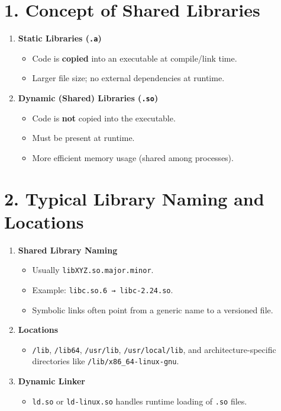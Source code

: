 \documentclass[a4paper]{report}
\begin{document}
\section*{1. Concept of Shared Libraries}

\begin{enumerate}
    \item \textbf{Static Libraries (\texttt{.a})}
    \begin{itemize}
        \item Code is \textbf{copied} into an executable at compile/link time.
        \item Larger file size; no external dependencies at runtime.
    \end{itemize}

    \item \textbf{Dynamic (Shared) Libraries (\texttt{.so})}
    \begin{itemize}
        \item Code is \textbf{not} copied into the executable.
        \item Must be present at runtime.
        \item More efficient memory usage (shared among processes).
    \end{itemize}
\end{enumerate}

\section*{2. Typical Library Naming and Locations}

\begin{enumerate}
    \item \textbf{Shared Library Naming}
    \begin{itemize}
        \item Usually \texttt{libXYZ.so.major.minor}.
        \item Example: \texttt{libc.so.6 → libc-2.24.so}.
        \item Symbolic links often point from a generic name to a versioned file.
    \end{itemize}

    \item \textbf{Locations}
    \begin{itemize}
        \item \texttt{/lib}, \texttt{/lib64}, \texttt{/usr/lib}, \texttt{/usr/local/lib}, and architecture-specific directories like \texttt{/lib/x86\_64-linux-gnu}.
    \end{itemize}

    \item \textbf{Dynamic Linker}
    \begin{itemize}
        \item \texttt{ld.so} or \texttt{ld-linux.so} handles runtime loading of \texttt{.so} files.
    \end{itemize}
\end{enumerate}
\end{document}
